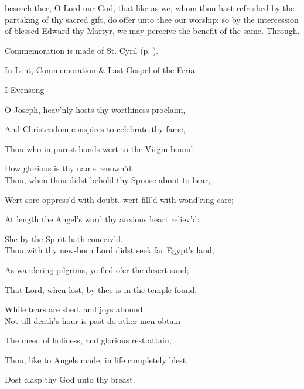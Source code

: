 \postcommunion\label{EdwardPostcommunion}
 beseech thee, O Lord our God, that like as we, whom thou hast refreshed by the partaking of thy sacred gift, do offer unto thee our worship: so by the intercession of blessed Edward thy Martyr, we may perceive the benefit of the same. Through.

\begin{rubric}
	Commemoration is made of St. Cyril (p. \pageref{CyrilPostcommunion}).
\end{rubric}
\begin{rubric}
	In Lent, Commemoration \& Last Gospel of the Feria.
\end{rubric}


\begin{paracol}{2}[]
\sloppy
\begin{inhead}
	I Evensong
\end{inhead}
\begin{hangparas}{1.25em}{1}
O Joseph, heav'nly hosts thy worthiness proclaim,

And Christendom conspires to celebrate thy fame,

Thou who in purest bonds wert to the Virgin bound;

How glorious is thy name renown'd.\\

Thou, when thou didst behold thy Spouse about to bear,

Wert sore oppress'd with doubt, wert fill'd with wond'ring care;

At length the Angel's word thy anxious heart reliev'd:

She by the Spirit hath conceiv'd.\\

Thou with thy new-born Lord didst seek far Egypt's land,

As wandering pilgrims, ye fled o'er the desert sand;

That Lord, when lost, by thee is in the temple found,

While tears are shed, and joys abound.\\

Not till death's hour is past do other men obtain

The meed of holiness, and glorious rest attain;

Thou, like to Angels made, in life completely blest,

Dost clasp thy God unto thy breast.\\


\end{hangparas}
\end{paracol}
